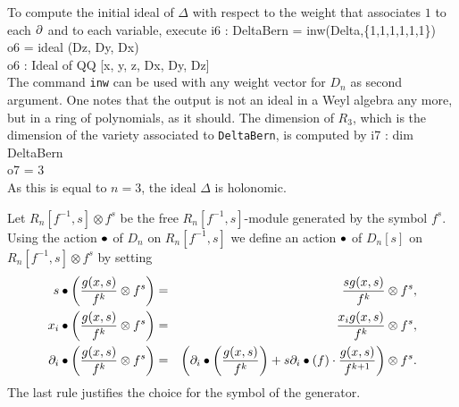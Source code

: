To compute the initial ideal of $\Delta$ with respect to the weight
that associates $1$ to each $\partial$ and to each variable, execute
\beginOutput
i6 : DeltaBern = inw(Delta,\{1,1,1,1,1,1\}) \\
\emptyLine
o6 = ideal (Dz, Dy, Dx)\\
\emptyLine
o6 : Ideal of QQ [x, y, z, Dx, Dy, Dz]\\
\endOutput
The command {\tt inw} can be used with any weight vector for $D_n$ as
second argument. 
One notes that the output is not an ideal in a Weyl algebra any more,
but in a ring of polynomials, as it should.
The dimension of $R_3$, which is the dimension of the variety
associated to {\tt DeltaBern}, is computed by
\beginOutput
i7 : dim DeltaBern \\
\emptyLine
o7 = 3\\
\endOutput
As this is equal to $n=3$, the ideal $\Delta$ is holonomic.

\bigskip

Let $R_n[f^{-1},s]\otimes f^s$ be the free $R_n[f^{-1},s]$-module
generated by the symbol $f^s$.  
Using the action $\bullet$ of $D_n$ on $R_n[f^{-1},s]$ we define an
action $\bullet$ 
of $D_n[s]$ on 
$R_n[f^{-1},s]\otimes f^s$ by setting
\begin{eqnarray*}
s\bullet \left(\frac{g(x,s)}{f^k}\otimes f^s\right)&=& 
\frac{sg(x,s)}{f^k}\otimes f^s,\\
x_i\bullet\left(\frac{g(x,s)}{f^k}\otimes f^s\right)&=&
 \frac{x_ig(x,s)}{f^k}\otimes f^s,\\
\partial_i\bullet\left(\frac{g(x,s)}{f^k}\otimes f^s\right)&=&
 \left(\partial_i\bullet\left(\frac{g(x,s)}{f^k}\right)+s\partial_i\bullet(f)\cdot
 \frac{g(x,s)}{f^{k+1}}\right)\otimes f^s.
\end{eqnarray*}
The last rule justifies the choice for the symbol of the generator.

